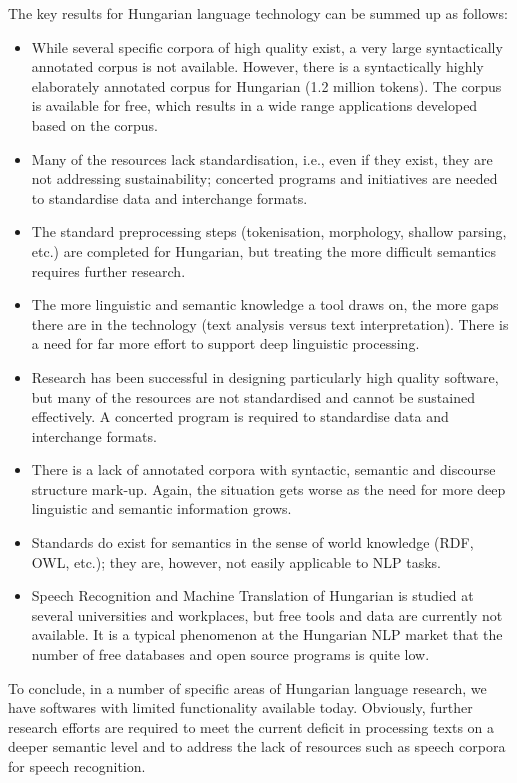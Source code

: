 \begin{multicols}{2}
  The key results for Hungarian language technology can be summed up as follows:

  \begin{itemize}
        \item While several specific corpora of high quality exist, a very large syntactically annotated corpus is not available. However, there is a syntactically highly elaborately annotated corpus for Hungarian (1.2 million tokens). The corpus is available for free, which results in a wide range applications developed based on the corpus.
        \item Many of the resources lack standardisation, i.e., even if they exist, they are not addressing sustainability; concerted programs and initiatives are needed to standardise data and interchange formats.
        \item The standard preprocessing steps (tokenisation, morphology, shallow parsing, etc.) are completed for Hungarian, but treating the more difficult semantics requires further research. 
        \item The more linguistic and semantic knowledge a tool draws on, the more gaps there are in the technology (text analysis versus text interpretation). There is a need for far more effort to support deep linguistic processing.
        \item Research has been successful in designing particularly high quality software, but many of the resources are not standardised and cannot be sustained effectively. A concerted program is required to standardise data and interchange formats.
        \item There is a lack of annotated corpora with syntactic, semantic and discourse structure mark-up. Again, the situation gets worse as the need for more deep linguistic and semantic information grows.
        \item Standards do exist for semantics in the sense of world knowledge (RDF, OWL, etc.); they are, however, not easily applicable to NLP tasks.
        \item Speech Recognition and Machine Translation of Hungarian is studied at several universities and workplaces, but free tools and data are currently not available. It is a typical phenomenon at the Hungarian NLP market that the number of free databases and open source programs is quite low.
      \end{itemize}

  To conclude, in a number of specific areas of Hungarian language research, we have softwares with limited functionality available today. Obviously, further research efforts are required to meet the current deficit in processing texts on a deeper semantic level and to address the lack of resources such as speech corpora for speech recognition.


\end{multicols}
